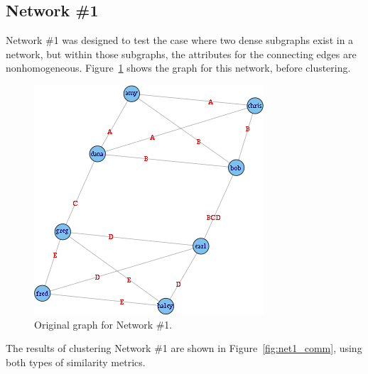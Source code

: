 \documentclass{report} %
\begin{document}
\subsection*{Network \#1}

Network \#1 was designed to test the case where two dense subgraphs exist in a network, but within those subgraphs, the attributes for the connecting edges are nonhomogeneous. Figure~\ref{fig:net1_orig} shows the graph for this network, before clustering.

\begin{figure}[htp!]
  \centering
  \includegraphics[width=0.55\linewidth]{toy2/orig.png}
  \caption{Original graph for Network \#1.}
  \label{fig:net1_orig}
\end{figure}

The results of clustering Network \#1 are shown in Figure~\ref{fig:net1_comm}, using both types of similarity metrics.\\
\end{document}
